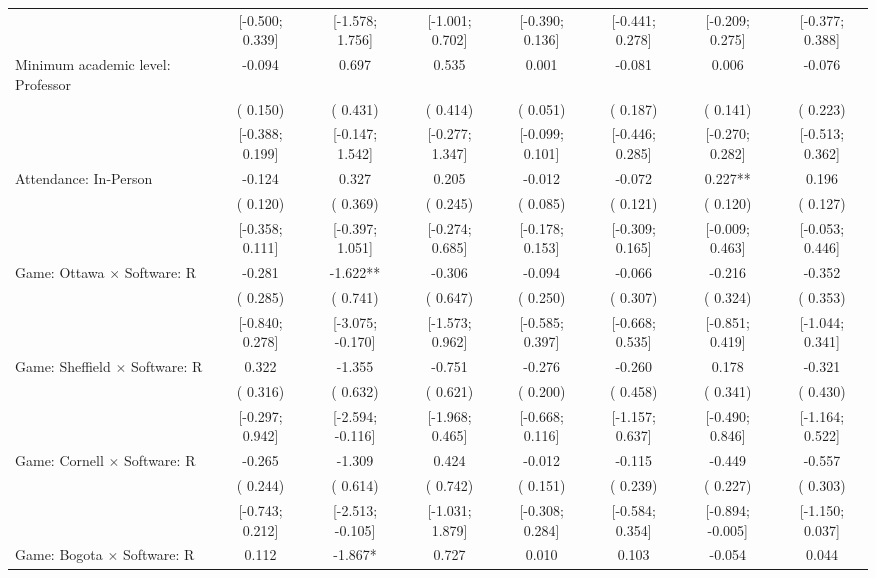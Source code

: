 \begin{tabular}{l*{7}{c}}
                    & [-0.500;  0.339] & [-1.578;  1.756] & [-1.001;  0.702] & [-0.390;  0.136] & [-0.441;  0.278] & [-0.209;  0.275] & [-0.377;  0.388] \\
Minimum academic level: Professor & -0.094 &  0.697 &  0.535 &  0.001 & -0.081 &  0.006 & -0.076 \\
                    & ( 0.150) & ( 0.431) & ( 0.414) & ( 0.051) & ( 0.187) & ( 0.141) & ( 0.223) \\
                    & [-0.388;  0.199] & [-0.147;  1.542] & [-0.277;  1.347] & [-0.099;  0.101] & [-0.446;  0.285] & [-0.270;  0.282] & [-0.513;  0.362] \\
Attendance: In-Person & -0.124 &  0.327 &  0.205 & -0.012 & -0.072 &  0.227** &  0.196 \\
                    & ( 0.120) & ( 0.369) & ( 0.245) & ( 0.085) & ( 0.121) & ( 0.120) & ( 0.127) \\
                    & [-0.358;  0.111] & [-0.397;  1.051] & [-0.274;  0.685] & [-0.178;  0.153] & [-0.309;  0.165] & [-0.009;  0.463] & [-0.053;  0.446] \\
Game: Ottawa $\times$ Software: R & -0.281 & -1.622** & -0.306 & -0.094 & -0.066 & -0.216 & -0.352 \\
                    & ( 0.285) & ( 0.741) & ( 0.647) & ( 0.250) & ( 0.307) & ( 0.324) & ( 0.353) \\
                    & [-0.840;  0.278] & [-3.075; -0.170] & [-1.573;  0.962] & [-0.585;  0.397] & [-0.668;  0.535] & [-0.851;  0.419] & [-1.044;  0.341] \\
Game: Sheffield $\times$ Software: R &  0.322 & -1.355 & -0.751 & -0.276 & -0.260 &  0.178 & -0.321 \\
                    & ( 0.316) & ( 0.632) & ( 0.621) & ( 0.200) & ( 0.458) & ( 0.341) & ( 0.430) \\
                    & [-0.297;  0.942] & [-2.594; -0.116] & [-1.968;  0.465] & [-0.668;  0.116] & [-1.157;  0.637] & [-0.490;  0.846] & [-1.164;  0.522] \\
Game: Cornell $\times$ Software: R & -0.265 & -1.309 &  0.424 & -0.012 & -0.115 & -0.449 & -0.557 \\
                    & ( 0.244) & ( 0.614) & ( 0.742) & ( 0.151) & ( 0.239) & ( 0.227) & ( 0.303) \\
                    & [-0.743;  0.212] & [-2.513; -0.105] & [-1.031;  1.879] & [-0.308;  0.284] & [-0.584;  0.354] & [-0.894; -0.005] & [-1.150;  0.037] \\
Game: Bogota $\times$ Software: R &  0.112 & -1.867* &  0.727 &  0.010 &  0.103 & -0.054 &  0.044 \\

\end{tabular}

